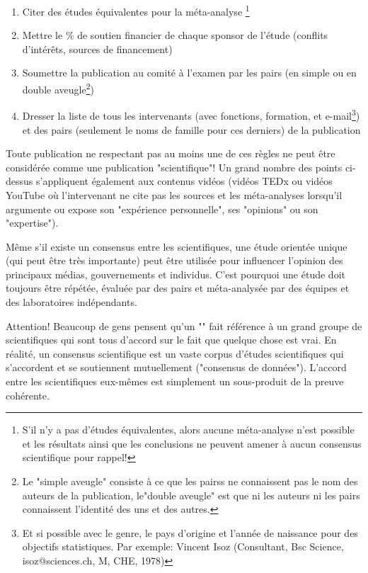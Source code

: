 \begin{enumerate}
		\item Citer des études équivalentes pour la méta-analyse \footnote{S'il n'y a pas d'études équivalentes, alors aucune méta-analyse n'est possible et les résultats ainsi que les conclusions ne peuvent amener à aucun consensus scientifique pour rappel!}
		
		\item Mettre le \% de soutien financier de chaque sponsor de l'étude (conflits d'intérêts, sources de financement)
		
		\item Soumettre la publication au comité à l'examen par les pairs (en simple ou en double aveugle\footnote{Le "simple aveugle" consiste à ce que les pairss ne connaissent pas le nom des auteurs de la publication, le"double aveugle" est que ni les auteurs ni les pairs connaissent l'identité des uns et des autres.})
		
		\item Dresser la liste de tous les intervenants (avec fonctions, formation, et e-mail\footnote{Et si possible avec le genre, le pays d'origine et l'année de naissance pour des objectifs statistiques. Par exemple: Vincent Isoz (Consultant, Bsc Science, isoz@sciences.ch, M, CHE, 1978)}) et des pairs (seulement le noms de famille pour ces derniers) de la publication
	\end{enumerate}
	Toute publication ne respectant pas au moins une de ces règles ne peut être considérée comme une publication "scientifique"! Un grand nombre des points ci-dessus s'appliquent également aux contenus vidéos (vidéos TEDx ou vidéos YouTube où l'intervenant ne cite pas les sources et les méta-analyses lorsqu'il argumente ou expose son "expérience personnelle", ses "opinions" ou son "expertise").
	\begin{tcolorbox}[title=Remark,colframe=black,arc=10pt]
	Même s'il existe un consensus entre les scientifiques, une étude orientée unique (qui peut être très importante) peut être utilisée pour influencer l'opinion des principaux médias, gouvernements et individus. C'est pourquoi une étude doit toujours être répétée, évaluée par des pairs et méta-analysée par des équipes et des laboratoires indépendants.
	\end{tcolorbox}
	Attention! Beaucoup de gens pensent qu'un "" fait référence à un grand groupe de scientifiques qui sont tous d'accord sur le fait que quelque chose est vrai. En réalité, un consensus scientifique est un vaste corpus d'études scientifiques qui s'accordent et se soutiennent mutuellement ("consensus de données"). L'accord entre les scientifiques eux-mêmes est simplement un sous-produit de la preuve cohérente.
	
